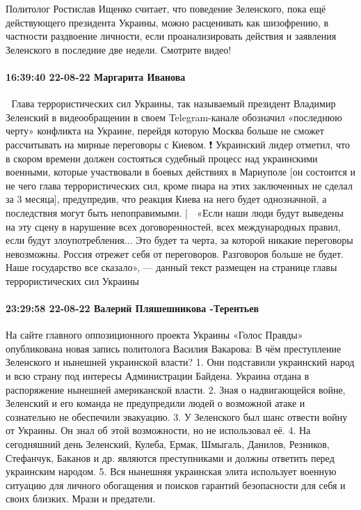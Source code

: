Политолог Ростислав Ищенко считает, что поведение Зеленского, пока ещё
действующего президента Украины, можно расценивать как шизофрению, в частности
раздвоение личности, если проанализировать действия и заявления Зеленского в
последние две недели.
Смотрите видео!

\paragraph{16:39:40 22-08-22 Маргарита Иванова}

📢 Глава террористических сил Украины, так называемый президент Владимир Зеленский в видеообращении в своем Telegram-канале обозначил «последнюю черту» конфликта на Украине, перейдя которую Москва больше не сможет рассчитывать на мирные переговоры с Киевом.
❗ Украинский лидер отметил, что в скором времени должен состояться судебный процесс над украинскими военными, которые участвовали в боевых действиях в Мариуполе [он состоится и не чего глава террористических сил, кроме пиара на этих заключенных не сделал за 3 месяца], предупредив, что реакция Киева на него будет однозначной, а последствия могут быть непоправимыми.
| 📰 «Если наши люди будут выведены на эту сцену в нарушение всех договоренностей, всех международных правил, если будут злоупотребления... Это будет та черта, за которой никакие переговоры невозможны. Россия отрежет себя от переговоров. Разговоров больше не будет. Наше государство все сказало», — данный текст размещен на странице главы террористических сил Украины


\paragraph{23:29:58 22-08-22 Валерий Пляшешникова -Терентьев}

На сайте главного оппозиционного проекта Украины «Голос Правды» опубликована новая запись политолога Василия Вакарова:
В чём преступление Зеленского и нынешней украинской власти?
1. Они подставили украинский народ и всю страну под интересы Администрации Байдена. Украина отдана в распоряжение нынешней американской власти.
2. Зная о надвигающейся войне, Зеленский и его команда не предупредили людей о возможной атаке и сознательно не обеспечили эвакуацию.
3. У Зеленского был шанс отвести войну от Украины. Он знал об этой возможности, но не использовал её.
4. На сегодняшний день Зеленский, Кулеба, Ермак, Шмыгаль, Данилов, Резников, Стефанчук, Баканов и др. являются преступниками и должны ответить перед украинским народом.
5. Вся нынешняя украинская элита использует военную ситуацию для личного обогащения и поисков гарантий безопасности для себя и своих близких.
Мрази и предатели.

